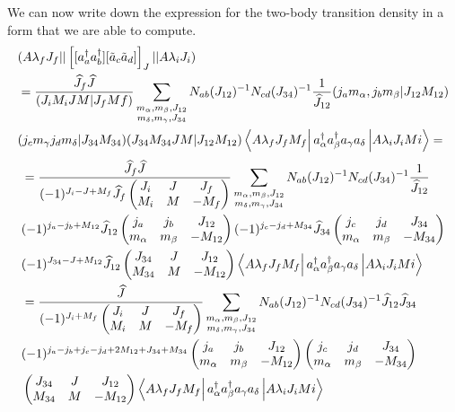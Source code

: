 \documentclass[12pt,a4paper]{article}
\newcommand{\matrixel}[3]{\left\langle #1 \vphantom{#2#3} \right|
 #2 \left| #3 \vphantom{#1#2} \right\rangle} %
\newcommand{\trej}[6]{
\begin{pmatrix}
  #1 & #2 & #3 \\
  #4 & #5 & #6
\end{pmatrix}}
\begin{document}
We can now write down the expression for the two-body transition density in a form that we are able to compute.
\begin{align}
\begin{split}
&(A\lambda_f J_f||\left[[a^\dagger_a a^\dagger_b][\tilde{a}_c\tilde{a}_d]\right]_{J}||A\lambda_i J_i)\\
&=\frac{\widehat{J}_f\widehat{J}}{(J_iM_iJM|J_fMf)}\sum_{\substack{m_{\alpha},m_{\beta},J_{12} \\m_{\delta},m_{\gamma},J_{34}}}N_{ab}(J_{12})^{-1}N_{cd}(J_{34})^{-1}\frac{1}{\widehat{J}_{12}} (j_a m_{\alpha},j_bm_{\beta}|J_{12}M_{12})\\
&(j_cm_{\gamma}j_dm_{\delta}|J_{34}{M_{34}})(J_{34}M_{34}JM|J_{12}M_{12})\matrixel{A\lambda_f J_f M_f}{a^\dagger_\alpha a^\dagger_{\beta}a_{\gamma }a_{\delta}}{A \lambda_i J_i Mi}=
\end{split}
\end{align}
\begin{align}
\begin{split}
&=\frac{\widehat{J}_f\widehat{J}}{(-1)^{J_i-J+M_{f}}\widehat{J}_f\trej{J_i}{J}{J_f}{M_i}{M}{-M_f} }\sum_{\substack{m_{\alpha},m_{\beta},J_{12} \\m_{\delta},m_{\gamma},J_{34}}}N_{ab}(J_{12})^{-1}N_{cd}(J_{34})^{-1}\frac{1}{\widehat{J}_{12}} \\
&(-1)^{j_a-j_b+M_{12}}\widehat{J}_{12}\trej{j_a}{j_b}{J_{12}}{m_{\alpha}}{m_{\beta}}{-M_{12}} (-1)^{j_c-j_d+M_{34}}\widehat{J}_{34}\trej{j_c}{j_d}{J_{34}}{m_{\alpha}}{m_{\beta}}{-M_{34}} \\
&(-1)^{J_{34}-J+M_{12}}\widehat{J}_{12}\trej{J_{34}}{J}{J_{12}}{M_{34}}{M}{-M_{12}}\matrixel{A\lambda_f J_f M_f}{a^\dagger_\alpha a^\dagger_{\beta}a_{\gamma }a_{\delta}}{A \lambda_i J_i Mi} \\
&=\frac{\widehat{J}}{(-1)^{J_i+M_{f}}\trej{J_i}{J}{J_f}{M_i}{M}{-M_f} }\sum_{\substack{m_{\alpha},m_{\beta},J_{12} \\m_{\delta},m_{\gamma},J_{34}}}N_{ab}(J_{12})^{-1}N_{cd}(J_{34})^{-1}\widehat{J}_{12}\widehat{J}_{34}\\
&(-1)^{j_a-j_b+j_c-j_d+2M_{12}+J_{34}+M_{34}}\trej{j_a}{j_b}{J_{12}}{m_{\alpha}}{m_{\beta}}{-M_{12}} \trej{j_c}{j_d}{J_{34}}{m_{\alpha}}{m_{\beta}}{-M_{34}} \\
&\trej{J_{34}}{J}{J_{12}}{M_{34}}{M}{-M_{12}}\matrixel{A\lambda_f J_f M_f}{a^\dagger_\alpha a^\dagger_{\beta}a_{\gamma }a_{\delta}}{A \lambda_i J_i Mi}
\end{split}
\end{align}
\end{document}
